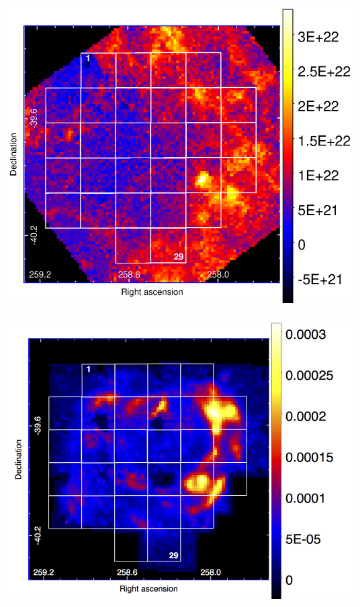 \documentclass[12pt,a4paper]{article}
\begin{document}
\begin{figure}[H]
	\begin{subfigure}{0.5\textwidth}
		\centering
		\includegraphics[width=1.0\linewidth, height=0.25\textheight]{Np_mopra_13pixels}
		\caption{}
		\label{fig:npmopra13pixels}
	\end{subfigure}
	\begin{subfigure}{0.5\textwidth}
		\centering
		\includegraphics[width=1.0\linewidth, height=0.25\textheight]{suzaku_13pixelrebin}
		\caption{}
		\label{fig:suzaku13pixelrebin}
	\end{subfigure}
\end{figure}
\end{document}
